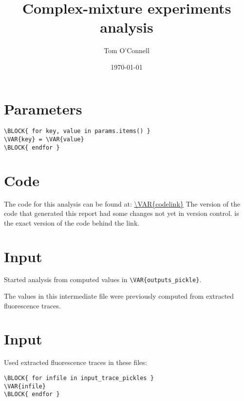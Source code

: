 \documentclass{article}
\begin{document}
\title{Complex-mixture experiments analysis}
\author{Tom O'Connell}
\date{\today}
\maketitle


\pagebreak

\begin{flushleft}
\section{Parameters}
\begin{verbatim}
\BLOCK{ for key, value in params.items() }
\VAR{key} = \VAR{value}
\BLOCK{ endfor }
\end{verbatim}

\section{Code}
The code for this analysis can be found at:
\linebreak
\url{\VAR{codelink}}
\linebreak
The version of the code that generated this report  had some changes not yet in version control.   is the exact version of the code behind the link.


\section{Input}
Started analysis from computed values in \verb=\VAR{outputs_pickle}=.

The values in this intermediate file were previously computed from extracted
fluorescence traces.

\section{Input}
Used extracted fluorescence traces in these files:
\begin{verbatim}
\BLOCK{ for infile in input_trace_pickles }
\VAR{infile}
\BLOCK{ endfor }
\end{verbatim}

\pagebreak
{}

\end{flushleft}
\end{document}
